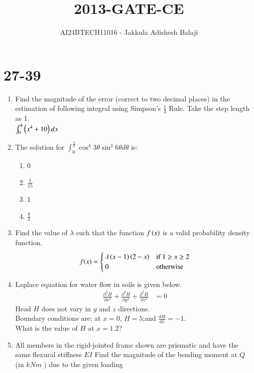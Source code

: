 \documentclass[journal]{IEEEtran}
\begin{document}

\title{2013-GATE-CE}
\author{AI24BTECH11016 - Jakkula Adishesh Balaji}
{\let\newpage\relax\maketitle}

\renewcommand{\thefigure}{\theenumi}
\renewcommand{\thetable}{\theenumi}
\setlength{\intextsep}{10pt} %
\section{27-39}
\begin{enumerate}
	\item
	Find the magnitude of the error (correct to two decimal places) in the estimation of following integral using Simpson's $\frac{1}{3}$ Rule. Take the step length as 1. \\
	$\int_{0}^{4} \left(x^{4}+10\right) dx$
	\item
	The solution for $\int_{0}^{\frac{\pi}{6}} \cos^{4}{3\theta}\sin^{3}{6\theta} d\theta$ is:
		\begin{enumerate}
			\item 0
			\item $\frac{1}{15}$
			\item 1
			\item $\frac{8}{3}$
		\end{enumerate}
	\item
	Find the value of $\lambda$ such that the function $f\left(x\right)$ is a valid probability density function.
		\begin{align*}
			f(x) =
			\begin{cases}
  				\lambda\left(x-1\right)\left(2-x\right) & \text{if } 1 \geq x \geq 2 \\
  				0 & \text{otherwise }
			\end{cases}
		\end{align*}
	\item
	Laplace equation for water flow in soils is given below.
		\begin{align*}
			\frac{\partial^2 H}{\partial x^2} + \frac{\partial^2 H}{\partial y^2} + \frac{\partial^2 H}{\partial z^2} &= 0
		\end{align*}
	Head $H$ does not vary in $y$ and $z$ directions. \\
	Boundary conditions are: at $x = 0$, $H = 5$;and $\frac{dH}{dx} = -1$. \\
	What is the value of $H$ at $x = 1.2$?
	\item
	All members in the rigid-jointed frame shown are prismatic and have the same flexural stiffness $EI$
Find the magnitude of the bending moment at $Q$ (in $kNm$ ) due to the given loading


\end{enumerate}
\end{document}
